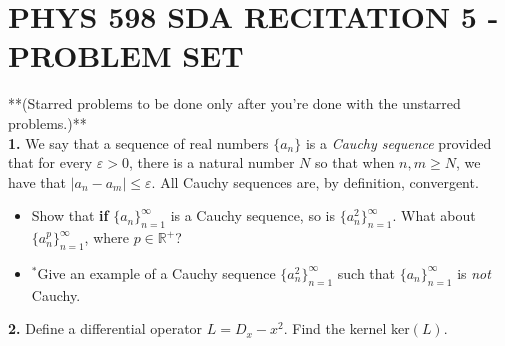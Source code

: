 \documentclass[aps,prl,groupedaddress,amsmath,amssymb,nofootinbib,11pt]{revtex4-1}
\begin{document}
\section{PHYS 598 SDA RECITATION 5 - PROBLEM SET}

**(Starred problems to be done only after you're done with the unstarred problems.)**\\

\textbf{1.} We say that a sequence of real numbers $\{a_n\}$ is a \emph{Cauchy sequence} provided that for every $\varepsilon > 0$, there is a natural number $N$ so that when $n, m \geq N$, we have that $|a_n -a_m| \leq \varepsilon$. All Cauchy sequences are, by definition, convergent.
\vspace{-2 mm}

\begin{itemize}
\item
Show that \textbf{if} $\{a_n\}_{n=1}^\infty$ is a Cauchy sequence, so is $\{a_n^2\}_{n=1}^\infty$. What about $\{a_n^p\}_{n=1}^\infty$, where $p \in \mathbb{R}^+$?
\vspace{-2 mm}

\item
$^*$Give an example of a Cauchy sequence $\{a_n^2\}_{n=1}^\infty$ such that $\{a_n\}_{n=1}^\infty$ is \emph{not} Cauchy.
\end{itemize}

\textbf{2.} Define a differential operator $L = D_x - x^2$. Find the kernel ker$(L)$.
\vspace{1 mm}
\end{document}
